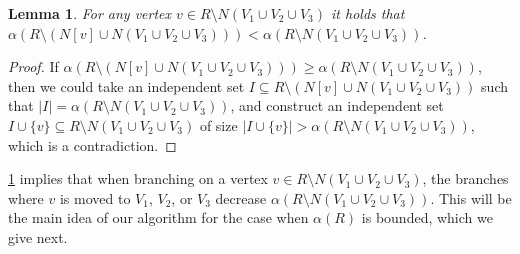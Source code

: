 \documentclass[11pt]{article}
\newtheorem{lemma}{Lemma}[section]
\theoremstyle{definition}
\begin{document}
\begin{lemma}
\label{obs:branchadec}
For any vertex $v \in R \setminus N(V_1 \cup V_2 \cup V_3)$ it holds that $\alpha(R \setminus (N[v] \cup N(V_1 \cup V_2 \cup V_3))) < \alpha(R \setminus N(V_1 \cup V_2 \cup V_3))$.
\end{lemma}
\begin{proof}
If $\alpha(R \setminus (N[v] \cup N(V_1 \cup V_2 \cup V_3))) \ge \alpha(R \setminus N(V_1 \cup V_2 \cup V_3))$, then we could take an independent set $I \subseteq R \setminus (N[v] \cup N(V_1 \cup V_2 \cup V_3))$ such that
$|I| = \alpha(R \setminus N(V_1 \cup V_2 \cup V_3))$, and construct an independent set $I \cup \{v\} \subseteq R \setminus N(V_1 \cup V_2 \cup V_3)$ of size $|I \cup \{v\}| > \alpha(R \setminus N(V_1 \cup V_2 \cup V_3))$, which is a contradiction.
\end{proof}

\cref{obs:branchadec} implies that when branching on a vertex $v \in R \setminus N(V_1 \cup V_2 \cup V_3)$, the branches where $v$ is moved to $V_1$, $V_2$, or $V_3$ decrease $\alpha(R \setminus N(V_1 \cup V_2 \cup V_3))$.
This will be the main idea of our algorithm for the case when $\alpha(R)$ is bounded, which we give next.
\end{document}
